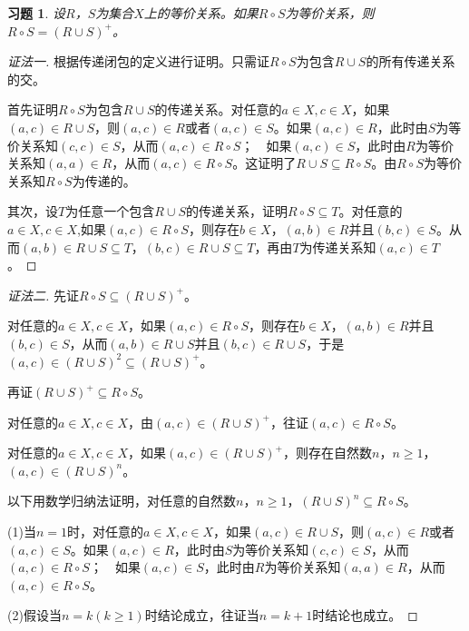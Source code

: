 \documentclass{article}
\begin{document}
\begin{CJK}{UTF8}{gbsn}
\newtheorem*{Exercise}{习题}
\begin{Exercise}
    设$R$，$S$为集合$X$上的等价关系。如果$R\circ S$为等价关系，则$R\circ S= (R\cup S)^+$。    
      \end{Exercise}
      \begin{proof}[证法一]
        根据传递闭包的定义进行证明。只需证$R\circ S$为包含$R\cup S$的所有传递关系的交。
      
        首先证明$R\circ S$为包含$R\cup S$的传递关系。对任意的$a\in X,c\in X$，如果$(a,c)\in R\cup S$，则$(a,c)\in R$或者$(a,c)\in S$。如果$(a,c)\in R$，此时由$S$为等价关系知$(c,c)\in S$，从而$(a,c)\in R\circ S$；　如果$(a,c)\in S$，此时由$R$为等价关系知$(a,a)\in R$，从而$(a,c)\in R\circ S$。这证明了$R\cup S\subseteq R\circ S$。由$R\circ S$为等价关系知$R\circ S$为传递的。
      
        其次，设$T$为任意一个包含$R\cup S$的传递关系，证明$R\circ S \subseteq T$。对任意的$a\in X,c\in X$,如果$(a,c)\in R\circ S$，则存在$b\in X$，$(a,b)\in R$并且$(b,c)\in S$。从而$(a,b)\in R\cup S \subseteq T$，$(b,c)\in R\cup S \subseteq T$，再由$T$为传递关系知$(a,c)\in T$。
      \end{proof}
      
      \begin{proof}[证法二]
        先证$R\circ S\subseteq (R\cup S)^+$。
      
        对任意的$a\in X,c\in X$，如果$(a,c)\in R\circ S$，则存在$b\in X$，$(a,b)\in R$并且$(b,c)\in S$，从而$(a,b)\in R\cup S$并且$(b,c)\in R\cup S$，于是$(a,c)\in (R\cup S)^2 \subseteq (R\cup S)^+$。
      
        再证$(R\cup S)^+\subseteq R\circ S$。
      
        对任意的$a\in X,c\in X$，由$(a,c)\in (R\cup S)^+$，往证$(a,c)\in R\circ S$。
      
        对任意的$a\in X,c\in X$，如果$(a,c)\in (R\cup S)^+$，则存在自然数$n$，$n\geq 1$，　$(a,c)\in (R\cup S)^n$。
      
        以下用数学归纳法证明，对任意的自然数$n$，$n\geq 1$，$(R\cup S)^n\subseteq R\circ S$。
      
        (1)当$n=1$时，对任意的$a\in X,c\in X$，如果$(a,c)\in R\cup S$，则$(a,c)\in R$或者$(a,c)\in S$。如果$(a,c)\in R$，此时由$S$为等价关系知$(c,c)\in S$，从而$(a,c)\in R\circ S$；　如果$(a,c)\in S$，此时由$R$为等价关系知$(a,a)\in R$，从而$(a,c)\in R\circ S$。
      
        (2)假设当$n=k(k\geq 1)$时结论成立，往证当$n=k+1$时结论也成立。
      

\end{proof}
\end{CJK}
\end{document}
